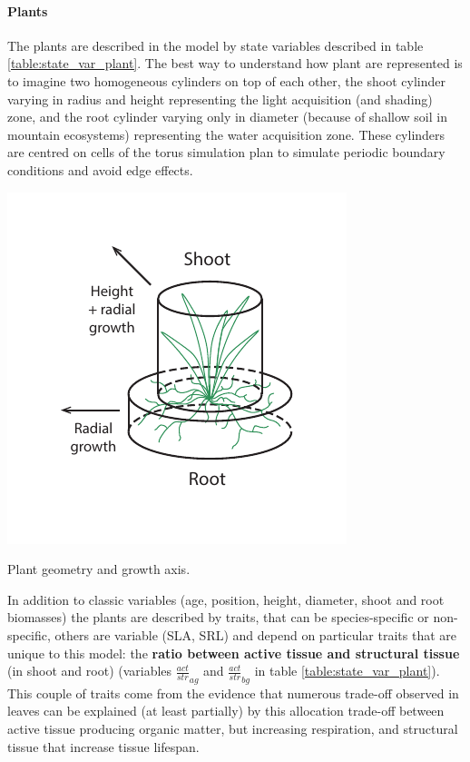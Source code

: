 \paragraph{Plants} The plants are described in the model by state variables described in table \ref{table:state_var_plant}. The best way to understand how plant are represented is to imagine two homogeneous cylinders on top of each other, the shoot cylinder varying in radius and height representing the light acquisition (and shading) zone, and the root cylinder varying only in diameter (because of shallow soil in mountain ecosystems) representing the water acquisition zone. These cylinders are centred on cells of the torus simulation plan to simulate periodic boundary conditions and avoid edge effects.\\
\begin{marginfigure}
\includegraphics{./Figures/plant_geometry_m.pdf}
\caption{Plant geometry and growth axis.}
\end{marginfigure}
\indent In addition to classic variables (age, position, height, diameter, shoot and root biomasses) the plants are described by traits, that can be species-specific or non-specific, others are variable (SLA, SRL) and depend on particular traits that are unique to this model: the \textbf{ratio between active tissue and structural tissue} (in shoot and root) (variables $\frac{act}{str}_{ag}$ and $\frac{act}{str}_{bg}$ in table \ref{table:state_var_plant}). This couple of traits come from the evidence that numerous trade-off observed in leaves can be explained (at least partially) by this allocation trade-off between active tissue producing organic matter, but increasing respiration, and structural tissue that increase tissue lifespan.

